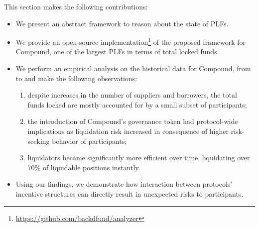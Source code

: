  This section makes the following contributions:
\begin{itemize}
    \item We present an abstract framework to reason about the state of PLFs.
    
    \item We provide an open-source implementation\footnote{\url{https://github.com/backdfund/analyzer}} of the proposed framework for Compound, one of the largest PLFs in terms of total locked funds.
    
    \item We perform an empirical analysis on the historical data for Compound, from \StartDate to \EndDate and make the following observations:
    \begin{enumerate}%
    \item despite increases in the number of suppliers and borrowers, the total funds locked are mostly accounted for by a small subset of participants; 
    \item the introduction of Compound's governance token had protocol-wide implications as liquidation risk increased in consequence of higher risk-seeking behavior of participants;
    \item liquidators became significantly more efficient over time, liquidating over 70\% of liquidable positions instantly.
    \end{enumerate}
    
    \item Using our findings, we demonstrate how interaction between protocols' incentive structures can directly result in unexpected risks to participants.
\end{itemize}
